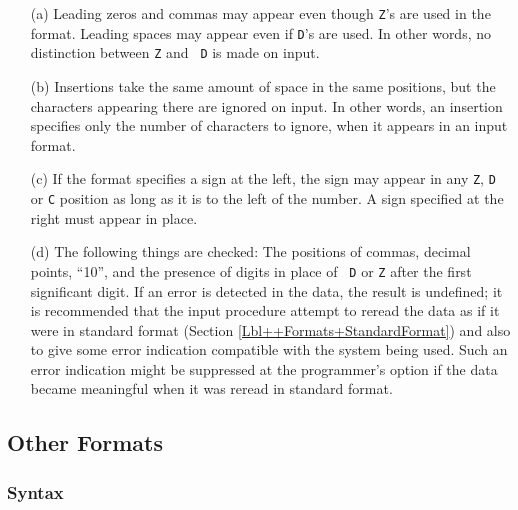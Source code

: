\documentclass[a4paper,11pt]{article}
\begin{document}
\begin{enumerate}

\item[(a)] Leading zeros and commas may appear even though {\tt Z}'s
  are used in the format. Leading spaces may appear even if {\tt D}'s
  are used.  In other words, no distinction between {\tt Z} and {\tt
  D} is made on input.

\item[(b)] Insertions take the same amount of space in the same
  positions, but the characters appearing there are ignored on input.
  In other words, an insertion specifies only the number of characters
  to ignore, when it appears in an input format.

\item[(c)] If the format specifies a sign at the left, the sign may
  appear in any {\tt Z}, {\tt D} or {\tt C} position as long as it is
  to the left of the number.  A sign specified at the right must
  appear in place.

\item[(d)] The following things are checked: The positions of commas,
  decimal points, ``10'', and the presence of digits in place of {\tt
  D} or {\tt Z} after the first significant digit.  If an error is
  detected in the data, the result is undefined; it is recommended
  that the input procedure attempt to reread the data as if it were in
  standard format (Section \ref{Lbl++Formats+StandardFormat}) and also to give some error indication
  compatible with the system being used.  Such an error indication
  might be suppressed at the programmer's option if the data became
  meaningful when it was reread in standard format.

\end{enumerate}


\subsection{Other Formats}

\subsubsection{Syntax}
\end{document}

